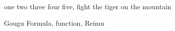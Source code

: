 \abstracten
one two three four five, fight the tiger on the mountain

\vspace{5pt}


\keywordsen Gougu Formula, function, Reimu